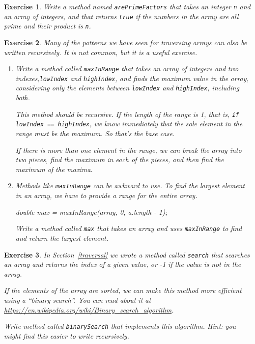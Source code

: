 \documentclass[12pt]{book}
\theoremstyle{exercise}
\newtheorem{exercise}{Exercise}[chapter]
\newcommand{\java}[1]{\verb"#1"}
\newcommand{\java}[1]{\lstinline{#1}} %
\begin{document}
\begin{exercise}
Write a method named \java{arePrimeFactors} that takes an integer \java{n} and an array of integers, and that returns \java{true} if the numbers in the array are all prime {\em and} their product is \java{n}.
\end{exercise}


\begin{exercise}
Many of the patterns we have seen for traversing arrays can also be written recursively.
It is not common, but it is a useful exercise.

\begin{enumerate}

\item Write a method called \java{maxInRange} that takes an array of integers and two indexes,\java{lowIndex} and \java{highIndex}, and finds the maximum value in the array, considering only the elements between \java{lowIndex} and \java{highIndex}, including both.

This method should be recursive.
If the length of the range is 1, that is, \java{if lowIndex == highIndex}, we know immediately that the sole element in the range must be the maximum.
So that's the base case.

If there is more than one element in the range, we can break the array into two pieces, find the maximum in each of the pieces, and then find the maximum of the maxima.

\item Methods like \java{maxInRange} can be awkward to use.
To find the largest element in an array, we have to provide a range for the entire array.

\begin{code}
    double max = maxInRange(array, 0, a.length - 1);
\end{code}

Write a method called \java{max} that takes an array and uses \java{maxInRange} to find and return the largest element.

\end{enumerate}
\end{exercise}


\begin{exercise}

In Section~\ref{traversal} we wrote a method called \java{search} that searches an array and returns the index of a given value, or -1 if the value is not in the array.

If the elements of the array are sorted, we can make this method more efficient using a ``binary search''.
You can read about it at \url{https://en.wikipedia.org/wiki/Binary_search_algorithm}.

Write method called \java{binarySearch} that implements this algorithm.
Hint: you might find this easier to write recursively.

\end{exercise}
\end{document}
